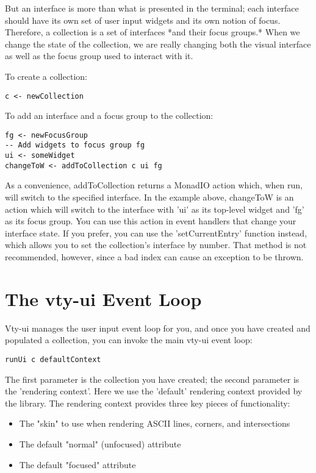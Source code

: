 \documentclass[11pt, letterpaper, oneside, titlepage]{article}
\begin{document}
But an interface is more than what is presented in the terminal; each
interface should have its own set of user input widgets and its own
notion of focus.  Therefore, a collection is a set of interfaces *and
their focus groups.*  When we change the state of the collection, we are
really changing both the visual interface as well as the focus group
used to interact with it.

To create a collection:

\begin{verbatim}
c <- newCollection
\end{verbatim}

To add an interface and a focus group to the collection:

\begin{verbatim}
fg <- newFocusGroup
-- Add widgets to focus group fg
ui <- someWidget
changeToW <- addToCollection c ui fg
\end{verbatim}

As a convenience, addToCollection returns a MonadIO action which, when
run, will switch to the specified interface.  In the example above,
changeToW is an action which will switch to the interface with 'ui' as
its top-level widget and 'fg' as its focus group.  You can use this
action in event handlers that change your interface state.  If you
prefer, you can use the 'setCurrentEntry' function instead, which allows
you to set the collection's interface by number.  That method is not
recommended, however, since a bad index can cause an exception to be
thrown.

\section{The vty-ui Event Loop}

Vty-ui manages the user input event loop for you, and once you have
created and populated a collection, you can invoke the main vty-ui event
loop:

\begin{verbatim}
runUi c defaultContext
\end{verbatim}

The first parameter is the collection you have created; the second
parameter is the 'rendering context'.  Here we use the 'default'
rendering context provided by the library.  The rendering context
provides three key pieces of functionality:

\begin{itemize}
\item The "skin" to use when rendering ASCII lines, corners, and
      intersections
\item The default "normal" (unfocused) attribute
\item The default "focused" attribute
\end{itemize}
\end{document}
